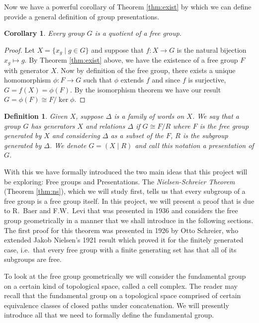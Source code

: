 \documentclass[12pt]{article}
\newtheorem{definition}{Definition}
\newtheorem{corollary}{Corollary}[theorem]
\theoremstyle{definition}
\numberwithin{equation}{theorem}
\begin{document}
Now we have a powerful corollary of Theorem \ref{thm:exist} by which we can define provide a general definition of group presentations.

\begin{corollary}
Every group $G$ is a quotient of a free group.
\end{corollary}

\begin{proof}
  Let $X = \{x_g \mid g \in G \}$ and suppose that $f:X \rightarrow G$ is the natural bijection $x_g \mapsto g$. By Theorem \ref{thm:exist} above, we have the existence of a free group $F$ with generator $X$. Now by definition of the free group, there exists a unique homomorphism $\phi:F \rightarrow G$ such that $\phi$ extends $f$ and since $f$ is surjective, $G = f(X) = \phi(F)$. By the isomorphism theorem we have our result $G = \phi(F) \cong F / \ker \phi$.
\end{proof}

\begin{definition}
  Given $X$, suppose $\Delta$ is a family of words on $X$. We say that a group $G$ has \emph{generators} $X$ and \emph{relations} $\Delta$ if $G \cong F/R$ where $F$ is the free group generated by $X$ and considering $\Delta$ as a subset of the $F$, $R$ is the subgroup generated by $\Delta$. We denote $G = (X \mid R)$ and call this notation a \emph{presentation} of $G$.
\end{definition}

With this we have formally introduced the two main ideas that this project will be exploring: Free groups and Presentations. The \emph{Nielsen-Schreier Theorem} (Theorem \ref{thm:ns}), which we will study first, tells us that every subgroup of a free group is a free group itself. In this project, we will present a proof that is due to R.\ Baer and F.W.\ Levi that was presented in 1936 and considers the free group geometrically in a manner that we shall introduce in the following sections. The first proof for this theorem was presented in 1926 by Otto Schreier, who extended Jakob Nielsen's 1921 result which proved it for the finitely generated case, i.e.\ that every free group with a finite generating set has that all of its subgroups are free.

To look at the free group geometrically we will consider the fundamental group on a certain kind of topological space, called a cell complex. The reader may recall that the fundamental group on a topological space comprised of certain equivalence classes of closed paths under concatenation. We will presently introduce all that we need to formally define the fundamental group.
\end{document}
